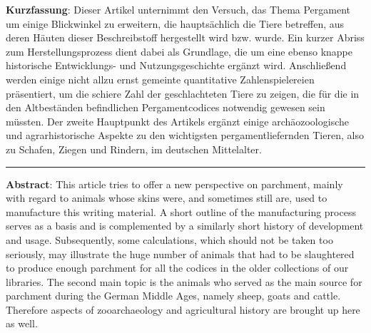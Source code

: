 \textbf{Kurzfassung}: Dieser Artikel unternimmt den Versuch, das Thema
Pergament um einige Blickwinkel zu erweitern, die hauptsächlich die
Tiere betreffen, aus deren Häuten dieser Beschreibstoff hergestellt wird
bzw. wurde. Ein kurzer Abriss zum Herstellungsprozess dient dabei als
Grundlage, die um eine ebenso knappe historische Entwicklungs- und
Nutzungsgeschichte ergänzt wird. Anschließend werden einige nicht allzu
ernst gemeinte quantitative Zahlenspielereien präsentiert, um die
schiere Zahl der geschlachteten Tiere zu zeigen, die für die in den
Altbeständen befindlichen Pergamentcodices notwendig gewesen sein
müssten. Der zweite Hauptpunkt des Artikels ergänzt einige
archäozoologische und agrarhistorische Aspekte zu den wichtigsten
pergamentliefernden Tieren, also zu Schafen, Ziegen und Rindern, im
deutschen Mittelalter.

\begin{center}\rule{0.5\linewidth}{0.5pt}\end{center}

\textbf{Abstract}: This article tries to offer a new perspective on
parchment, mainly with regard to animals whose skins were, and sometimes
still are, used to manufacture this writing material. A short outline of
the manufacturing process serves as a basis and is complemented by a
similarly short history of development and usage. Subsequently, some
calculations, which should not be taken too seriously, may illustrate
the huge number of animals that had to be slaughtered to produce enough
parchment for all the codices in the older collections of our libraries.
The second main topic is the animals who served as the main source for
parchment during the German Middle Ages, namely sheep, goats and cattle.
Therefore aspects of zooarchaeology and agricultural history are brought
up here as well.

